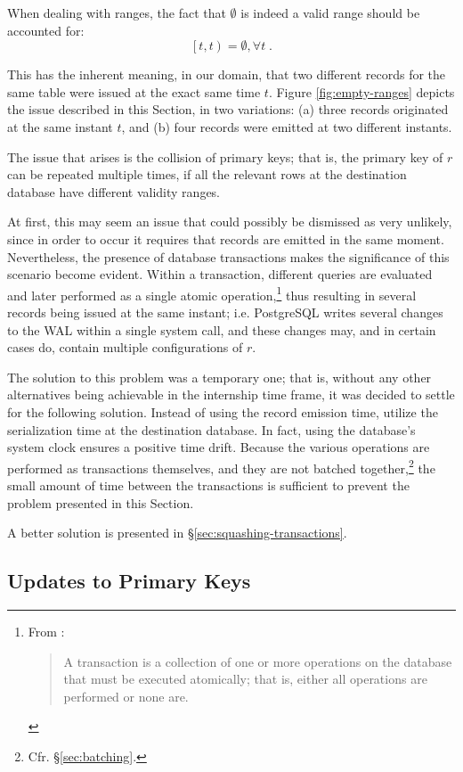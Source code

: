 When dealing with ranges, the fact that $\emptyset$ is indeed a valid range should be accounted for:
$$
\left[t, t\right) = \emptyset, \forall t \; .
$$

This has the inherent meaning, in our domain, that two different records for the same table were issued at the exact same time $t$.
Figure \ref{fig:empty-ranges} depicts the issue described in this Section, in two variations: (a) three records originated at the same instant $t$, and (b) four records were emitted at two different instants.

The issue that arises is the collision of primary keys; that is, the primary key of $r$ can be repeated multiple times, if all the relevant rows at the destination database have different validity ranges.

At first, this may seem an issue that could possibly be dismissed as very unlikely, since in order to occur it requires that records are emitted in the same moment.
Nevertheless, the presence of database transactions makes the significance of this scenario become evident.
Within a transaction, different queries are evaluated and later performed as a single atomic operation,\footnote{%
	From \cite[\S 6.6.3]{db-systems}:
	\begin{quote}
		A transaction is a collection of one or more operations on the database that must be executed atomically; that is, either all operations are performed or none are.
	\end{quote}
} thus resulting in several records being issued at the same instant; i.e. PostgreSQL writes several changes to the WAL within a single system call, and these changes may, and in certain cases do, contain multiple configurations of $r$.

The solution to this problem was a temporary one; that is, without any other alternatives being achievable in the internship time frame, it was decided to settle for the following solution.
Instead of using the record emission time, utilize the serialization time at the destination database.
In fact, using the database's system clock ensures a positive time drift.
Because the various operations are performed as transactions themselves, and they are not batched together,\footnote{%
	Cfr. \S \ref{sec:batching}.
} the small amount of time between the transactions is sufficient to prevent the problem presented in this Section.

A better solution is presented in \S \ref{sec:squashing-transactions}.


\subsection{Updates to Primary Keys}
\label{sec:tt-primary-keys-updates}

